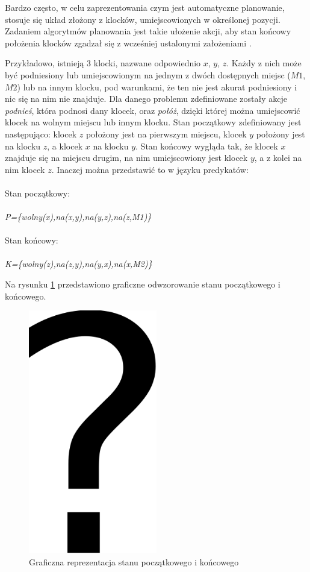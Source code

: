 Bardzo często, w celu zaprezentowania czym jest automatyczne planowanie, stosuje się układ złożony z klocków, umiejscowionych w określonej pozycji. Zadaniem algorytmów planowania jest takie ułożenie akcji, aby stan końcowy położenia klocków zgadzał się z wcześniej ustalonymi założeniami \cite{klocki}.

Przykładowo, istnieją 3 klocki, nazwane odpowiednio $x$, $y$, $z$. Każdy z nich może być podniesiony lub umiejscowionym na jednym z dwóch dostępnych miejsc ($M1$, $M2$) lub na innym klocku, pod warunkami, że ten nie jest akurat podniesiony i nic się na nim nie znajduje. Dla danego problemu zdefiniowane zostały akcje \emph{podnieś}, która podnosi dany klocek, oraz \emph{połóż}, dzięki której można umiejscowić klocek na wolnym miejscu lub innym klocku. Stan początkowy zdefiniowany jest następująco: klocek $z$ położony jest na pierwszym miejscu, klocek $y$ położony jest na klocku $z$, a klocek $x$ na klocku $y$. Stan końcowy wygląda tak, że klocek $x$ znajduje się na miejscu drugim, na nim umiejscowiony jest klocek $y$, a z kolei na nim klocek $z$. Inaczej można przedstawić to w języku predykatów:
\\\\
Stan początkowy:
\\\\
\textit{P=\{wolny(x),na(x,y),na(y,z),na(z,M1)\}}
\\\\
Stan końcowy:
\\\\
\textit{K=\{wolny(z),na(z,y),na(y,x),na(x,M2)\}}

Na rysunku \ref{fig:automatyczne-planowanie} przedstawiono graficzne odwzorowanie stanu początkowego i końcowego.
\begin{figure}[h!]
    \centering
    \includegraphics[width=0.5\textwidth]{img/rys2,1}
    \caption{Graficzna reprezentacja stanu początkowego i końcowego}
    \label{fig:automatyczne-planowanie}
\end{figure}


